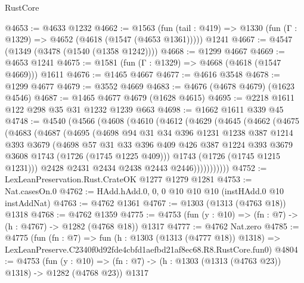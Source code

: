 \begin{lexlean}{RustCore}
\begin{coremodule}
@4653 := @4633 @1232
@4662 := @1563
    (fun (tail : @419) => @1330 (fun (Γ : @1329) => @4652 (@4618 (@1547 (@4653 @1361)))))
    @1241
@4667 := @4547 (@1349 (@3478 (@1540 (@1358 @1242))))
@4668 := @1299 @4667
@4669 := @4653 @1241
@4675 := @1581 (fun (Γ : @1329) => @4668 (@4618 (@1547 @4669))) @1611
@4676 := @1465 @4667
@4677 := @4616 @3548
@4678 := @1299 @4677
@4679 := @3552 @4669
@4683 := @4676 (@4678 @4679) (@1623 @4546)
@4687 := @1465 @4677 @4679 (@1628 @4615)
@4695 := @2218 @1611 @122 @298 @35 @31 @1232 @1239 @663
@4698 := @1662 @1611 @339 @45
@4748 := @4540
    (@4566
      (@4608
        (@4610
          (@4612
            (@4629
              (@4645
                (@4662
                  (@4675
                    (@4683
                      (@4687
                        (@4695
                          (@4698
                            @94
                            @31
                            @34
                            @396
                            @1231
                            @1238
                            @387
                            @1214
                            @393
                            @3679
                            (@4698
                              @57
                              @31
                              @33
                              @396
                              @409
                              @426
                              @387
                              @1224
                              @393
                              @3679
                              @3608
                              @1743
                              (@1726 (@1745 @1225 @409)))
                            @1743
                            (@1726 (@1745 @1215 @1231)))
                          @2428
                          @2431
                          @2434
                          @2438
                          @2443
                          @2446)))))))))))
@4752 := LexLeanPreservation.Rust.CrateOK @1277 @1279 @1281
@4753 := Nat.casesOn.{0}
@4762 := HAdd.hAdd.{0, 0, 0} @10 @10 @10 (instHAdd.{0} @10 instAddNat)
@4763 := @4762 @1361
@4767 := @1303 (@1313 (@4763 @18)) @1318
@4768 := @4762 @1359
@4775 := @4753 (fun (y : @10) => (fn : @7) -> (h : @4767) -> @1282 (@4768 @18)) @1317
@4777 := @4762 Nat.zero
@4785 := @4775
    (fun (fn : @7) =>
    fun (h : @1303 (@1313 (@4777 @18)) @1318) =>
    LexLeanPreserve.C2340f0d92fde4cbfd1aefbd21af8ec68.R8.RustCore.fun0)
@4804 := @4753
    (fun (y : @10) => (fn : @7) -> (h : @1303 (@1313 (@4763 @23)) @1318) -> @1282 (@4768 @23))
    @1317

\end{coremodule}
\end{lexlean}
